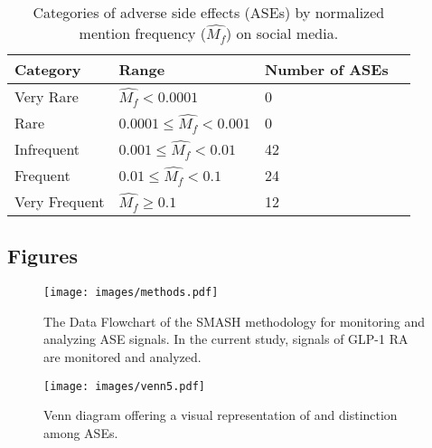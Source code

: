 \documentclass[referee,bst/sn-basic]{sn-jnl}%
\theoremstyle{thmstyletwo}%
\theoremstyle{thmstylethree}%
\begin{document}
\begin{table}[h]
    \centering
    \caption{Categories of adverse side effects (ASEs) by normalized mention frequency ($\hat{M_f}$) on social media.}
    \label{tbl:freq_1}
    \begin{tabular}{llll}
    \toprule
    Category   &  Range & Number of ASEs\\
    \midrule
      Very Rare   &  $\hat{M_f} < 0.0001$ & 0 \\
      Rare   & $  0.0001 \leq \hat{M_f} < 0.001$  & 0 \\
      Infrequent   & $ 0.001 \leq \hat{M_f} < 0.01$ & 42 \\
      Frequent   & $0.01 \leq \hat{M_f} < 0.1$ & 24 \\
      Very Frequent   & $\hat{M_f} \geq  0.1$ & 12 \\
    \bottomrule
    \end{tabular}
\end{table}



\newpage
\subsection*{Figures}

\begin{figure}[H]
    \centering
    \texttt{[image: images/methods.pdf]}
    \caption{The Data Flowchart of the SMASH methodology for monitoring and analyzing ASE signals.
    In the current study, signals of GLP-1 RA are monitored and analyzed.}
    \label{fig:methods}
\end{figure}





\begin{sidewaysfigure}
    \centering
    \texttt{[image: images/venn5.pdf]}
    \caption{Venn diagram offering a visual representation of and distinction among ASEs.}
    \label{fig:venn}
\end{sidewaysfigure}
\end{document}

